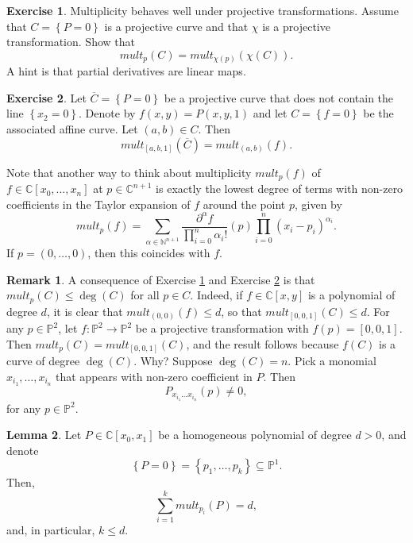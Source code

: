 \documentclass{article}
\newcommand{\N}{\mathbb{N}}
\newcommand{\C}{\mathbb{C}}
\renewcommand{\P}{\mathbb{P}}
\newcommand{\rb}[1]{\left( #1 \right)}
\renewcommand{\sb}[1]{\left[ #1 \right]}
\newcommand{\cb}[1]{\left\{ #1 \right\}}
\theoremstyle{definition}\newtheorem{definition}{Definition}[section]
\theoremstyle{definition}\newtheorem{notation}[definition]{Notation}
\theoremstyle{definition}\newtheorem{remark}[definition]{Remark}
\theoremstyle{definition}\newtheorem{example1}[definition]{Example}
\theoremstyle{definition}\newtheorem{fact}{Fact}
\theoremstyle{definition}\newtheorem{exercise}{Exercise}
\theoremstyle{definition}\newtheorem*{example2}{Example}
\newtheorem{lemma}[definition]{Lemma}
\begin{document}
\begin{exercise}
\label{ex:32}
Multiplicity behaves well under projective transformations. Assume that $ C = \cb{P = 0} $ is a projective curve and that $ \chi $ is a projective transformation. Show that
$$ mult_p\rb{C} = mult_{\chi\rb{p}}\rb{\chi\rb{C}}. $$
A hint is that partial derivatives are linear maps.
\end{exercise}

\begin{exercise}
\label{ex:33}
Let $ \overline{C} = \cb{P = 0} $ be a projective curve that does not contain the line $ \cb{x_2 = 0} $. Denote by $ f\rb{x, y} = P\rb{x, y, 1} $ and let $ C = \cb{f = 0} $ be the associated affine curve. Let $ \rb{a, b} \in C $. Then
$$ mult_{\sb{a, b, 1}}\rb{\overline{C}} = mult_{\rb{a, b}}\rb{f}. $$
\end{exercise}

Note that another way to think about multiplicity $ mult_p\rb{f} $ of $ f \in \C\sb{x_0, \dots, x_n} $ at $ p \in \C^{n + 1} $ is exactly the lowest degree of terms with non-zero coefficients in the Taylor expansion of $ f $ around the point $ p $, given by
$$ mult_p\rb{f} = \sum_{\alpha \in \N^{n + 1}} \dfrac{\partial^\alpha f}{\prod_{i = 0}^n \alpha_i!}\rb{p}\prod_{i = 0}^n \rb{x_i - p_i}^{\alpha_i}. $$
If $ p = \rb{0, \dots, 0} $, then this coincides with $ f $.

\begin{remark}
\label{rem:11.4}
A consequence of Exercise \ref{ex:32} and Exercise \ref{ex:33} is that $ mult_p\rb{C} \le \deg\rb{C} $ for all $ p \in C $. Indeed, if $ f \in \C\sb{x, y} $ is a polynomial of degree $ d $, it is clear that $ mult_{\rb{0, 0}}\rb{f} \le d $, so that $ mult_{\sb{0, 0, 1}}\rb{C} \le d $. For any $ p \in \P^2 $, let $ f : \P^2 \to \P^2 $ be a projective transformation with $ f\rb{p} = \sb{0, 0, 1} $. Then $ mult_p\rb{C} = mult_{\sb{0, 0, 1}}\rb{C} $, and the result follows because $ f\rb{C} $ is a curve of degree $ \deg\rb{C} $. Why? Suppose $ \deg\rb{C} = n $. Pick a monomial $ x_{i_1}, \dots, x_{i_n} $ that appears with non-zero coefficient in $ P $. Then
$$ P_{x_{i_1} \dots x_{i_n}}\rb{p} \ne 0, $$
for any $ p \in \P^2 $.
\end{remark}

\begin{lemma}
\label{lem:11.5}
Let $ P \in \C\sb{x_0, x_1} $ be a homogeneous polynomial of degree $ d > 0 $, and denote
$$ \cb{P = 0} = \cb{p_1, \dots, p_k} \subseteq \P^1. $$
Then,
$$ \sum_{i = 1}^k mult_{p_i}\rb{P} = d, $$
and, in particular, $ k \le d $.
\end{lemma}
\end{document}

